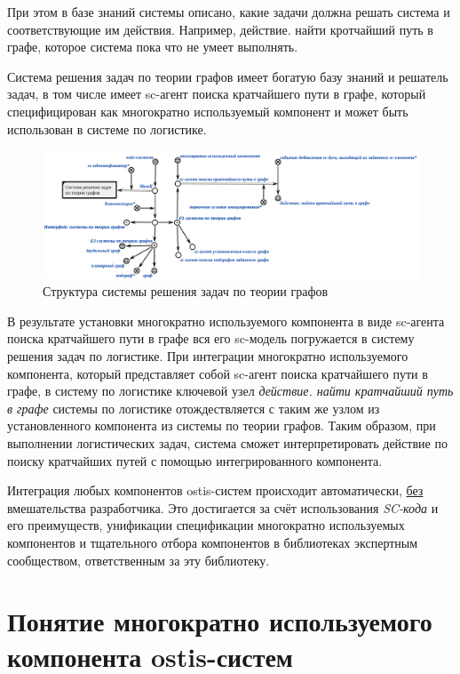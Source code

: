 При этом в базе знаний системы описано, какие задачи должна решать система и соответствующие им действия. Например, действие. найти кротчайший путь в графе, которое система пока что не умеет выполнять.

Система решения задач по теории графов имеет богатую базу знаний и решатель задач, в том числе имеет sc-агент поиска кратчайшего пути в графе, который специфицирован как многократно используемый компонент и может быть использован в системе по логистике.

\begin{figure}[H]
	\includegraphics[scale=0.4]{author/part5/figures/graph_theory_system.png}
	\caption{Структура системы решения задач по теории графов}
	\label{fig:graph_theory_system}
\end{figure}

В результате установки многократно используемого компонента в виде sc-агента поиска кратчайшего пути в графе вся его sc-модель погружается в систему решения задач по логистике. При интеграции многократно используемого компонента, который представляет собой sc-агент поиска кратчайшего пути в графе, в систему по логистике ключевой узел \textit{действие. найти кратчайший путь в графе} системы по логистике отождествляется с таким же узлом из установленного компонента из системы по теории графов. Таким образом, при выполнении логистических задач, система сможет интерпретировать действие по поиску кратчайших путей с помощью интегрированного компонента.

Интеграция любых компонентов ostis-систем происходит автоматически, \underline{без} вмешательства разработчика. Это достигается за счёт использования \textit{SC-кода} и его преимуществ, унификации спецификации многократно используемых компонентов и тщательного отбора компонентов в библиотеках экспертным сообществом, ответственным за эту библиотеку.

\section{Понятие многократно используемого компонента ostis-систем}
\label{reusable_component_section}

